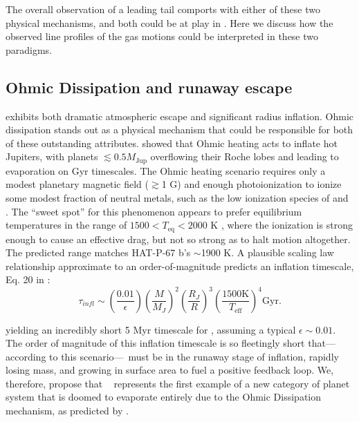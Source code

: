 \documentclass[twocolumn]{aastex631}
\newcommand{\hatpb}{\object{HAT-P-67 b}}
\begin{document}
The overall observation of a leading tail comports with either of these two physical mechanisms, and both could be at play in \hatpb.  Here we discuss how the observed line profiles of the gas motions could be interpreted in these two paradigms.

\subsection{Ohmic Dissipation and runaway escape}
 exhibits both dramatic atmospheric escape and significant radius inflation.  Ohmic dissipation stands out as a physical mechanism that could be responsible for both of these outstanding attributes.  \citet{2011ApJ...738....1B} showed that Ohmic heating acts to inflate hot Jupiters, with planets $\lesssim 0.5 M_\mathrm{Jup}$ overflowing their Roche lobes and leading to evaporation on Gyr timescales.  The Ohmic heating scenario requires only a modest planetary magnetic field ($\gtrsim$1 G) and enough photoionization to ionize some modest fraction of neutral metals, such as the low ionization species of  and .  The ``sweet spot'' for this phenomenon appears to prefer equilibrium temperatures in the range of $1500<T_\mathrm{eq}<2000$ K \citep{2011ApJ...738....1B}, where the ionization is strong enough to cause an effective drag, but not so strong as to halt motion altogether.  The predicted range matches HAT-P-67 b's $\sim$1900 K.  A plausible scaling law relationship approximate to an order-of-magnitude predicts an inflation timescale, Eq. 20 in \citet{2011ApJ...738....1B}:
\begin{equation}
    \tau_{\textit{infl}}\sim \left(\frac{0.01}{\epsilon} \right) \left(\frac{M}{M_{J}}\right)^2 \left(\frac{R_{J}}{R}\right)^3 \left(\frac{1500 \textrm{K}}{T_\mathrm{eff}}\right)^4 \textrm{Gyr}. \label{eqInflate}
\end{equation}


\noindent yielding an incredibly short 5 Myr timescale for \hatpb, assuming a typical $\epsilon\sim0.01$. The order of magnitude of this inflation timescale is so fleetingly short that---according to this scenario---\hatpb~must be in the runaway stage of inflation, rapidly losing mass, and growing in surface area to fuel a positive feedback loop.  We, therefore, propose that \hatpb~ represents the first example of a new category of planet system that is doomed to evaporate entirely due to the Ohmic Dissipation mechanism, as predicted by \citet{2011ApJ...738....1B}.
\end{document}
